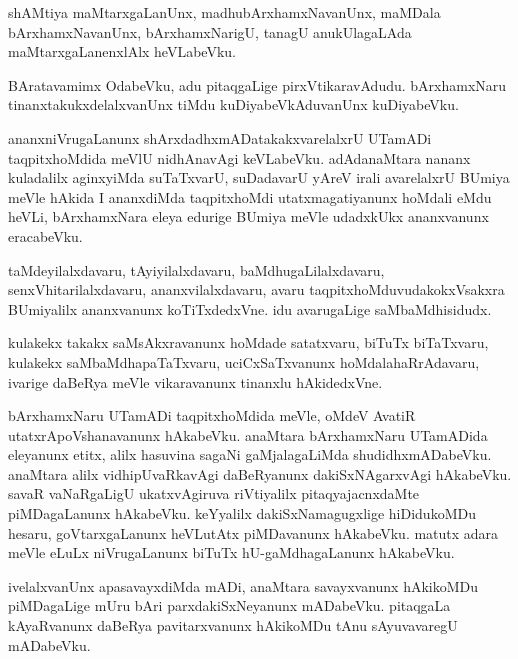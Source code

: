 \documentclass{article}
\begin{document}
\begin{mn}%
shAMtiya maMtarxgaLanUnx, madhubArxhamxNavanUnx, maMDala
bArxhamxNavanUnx, bArxhamxNarigU, tanagU anukUlagaLAda
maMtarxgaLanenxlAlx heVLabeVku.
\end{mn}

\begin{mn}%
BAratavamimx OdabeVku, adu pitaqgaLige pirxVtikaravAdudu. bArxhamxNaru
tinanxtakukxdelalxvanUnx tiMdu kuDiyabeVkAduvanUnx kuDiyabeVku.
\end{mn}

\begin{mn}%
ananxniVrugaLanunx shArxdadhxmADatakakxvarelalxrU UTamADi
taqpitxhoMdida meVlU nidhAnavAgi keVLabeVku. adAdanaMtara nananx
kuladalilx aginxyiMda suTaTxvarU, suDadavarU yAreV irali avarelalxrU
BUmiya meVle hAkida I ananxdiMda taqpitxhoMdi utatxmagatiyanunx
hoMdali eMdu heVLi, bArxhamxNara eleya edurige BUmiya meVle udadxkUkx
ananxvanunx eracabeVku.
\end{mn}

\begin{mn}
taMdeyilalxdavaru, tAyiyilalxdavaru, baMdhugaLilalxdavaru,
senxVhitarilalxdavaru, ananxvilalxdavaru, avaru
taqpitxhoMduvudakokxVsakxra BUmiyalilx ananxvanunx koTiTxdedxVne. idu
avarugaLige saMbaMdhisidudx.
\end{mn}

\begin{mn}
kulakekx takakx saMsAkxravanunx hoMdade satatxvaru, biTuTx biTaTxvaru,
kulakekx saMbaMdhapaTaTxvaru, uciCxSaTxvanunx hoMdalahaRrAdavaru,
ivarige daBeRya meVle vikaravanunx tinanxlu hAkidedxVne.
\end{mn}

\begin{mn}%
bArxhamxNaru UTamADi taqpitxhoMdida meVle, oMdeV AvatiR
utatxrApoVshanavanunx hAkabeVku. anaMtara bArxhamxNaru UTamADida
eleyanunx etitx, alilx hasuvina sagaNi gaMjalagaLiMda
shudidhxmADabeVku. anaMtara alilx vidhipUvaRkavAgi daBeRyanunx
dakiSxNAgarxvAgi hAkabeVku. savaR vaNaRgaLigU ukatxvAgiruva
riVtiyalilx pitaqyajacnxdaMte piMDagaLanunx hAkabeVku. keYyalilx
dakiSxNamagugxlige hiDidukoMDu hesaru, goVtarxgaLanunx heVLutAtx
piMDavanunx hAkabeVku. matutx adara meVle eLuLx niVrugaLanunx biTuTx
hU-gaMdhagaLanunx hAkabeVku.
\end{mn}

\begin{mn}
ivelalxvanUnx apasavayxdiMda mADi, anaMtara savayxvanunx hAkikoMDu
piMDagaLige mUru bAri parxdakiSxNeyanunx mADabeVku. pitaqgaLa
kAyaRvanunx daBeRya pavitarxvanunx hAkikoMDu tAnu sAyuvavaregU mADabeVku.
\end{mn}
\end{document}
